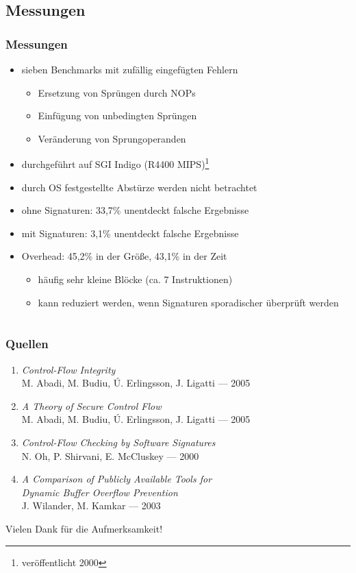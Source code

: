 \documentclass[mathserif,slidestop,compress,red]{beamer}
\begin{document}
\subsection{Messungen}

\begin{frame}
  \frametitle{Messungen}
  \begin{itemize}
    \item sieben Benchmarks mit zufällig eingefügten Fehlern
    \begin{itemize}
      \item Ersetzung von Sprüngen durch NOPs
      \item Einfügung von unbedingten Sprüngen
      \item Veränderung von Sprungoperanden
    \end{itemize}
    \item durchgeführt auf SGI Indigo (R4400 MIPS)\footnote{veröffentlicht 2000}
    \item durch OS festgestellte Abstürze werden nicht betrachtet
    \item ohne Signaturen: 33,7\% unentdeckt falsche Ergebnisse
    \item mit Signaturen: 3,1\% unentdeckt falsche Ergebnisse
    \item Overhead: 45,2\% in der Größe, 43,1\% in der Zeit
    \begin{itemize}
      \item häufig sehr kleine Blöcke (ca. 7 Instruktionen)
      \item kann reduziert werden, wenn Signaturen sporadischer überprüft werden
    \end{itemize}
  \end{itemize}
\end{frame}

\section*{}

\begin{frame}
  \frametitle{Quellen}
  \begin{enumerate}
    \item \emph{Control-Flow Integrity} \\ M. Abadi, M. Budiu, Ú. Erlingsson, J. Ligatti — 2005
    \item \emph{A Theory of Secure Control Flow} \\ M. Abadi, M. Budiu, Ú. Erlingsson, J. Ligatti — 2005
    \item \emph{Control-Flow Checking by Software Signatures} \\ N. Oh, P. Shirvani, E. McCluskey — 2000
    \item \emph{A Comparison of Publicly Available Tools for \\ Dynamic Buffer Overflow Prevention} \\
        J. Wilander, M. Kamkar — 2003
  \end{enumerate}
\end{frame}

{
\begin{frame}[c,plain]
  \begin{center}
    Vielen Dank für die Aufmerksamkeit!
  \end{center}
\end{frame}
}
\end{document}
